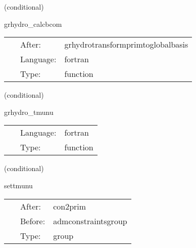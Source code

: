 \documentclass{article}
\begin{document}
\vspace{5mm}

   (conditional) 

\hspace{5mm} grhydro\_calcbcom 

\hspace{5mm}{\it compute comoving magnetic field, pressure, etc... } 


\hspace{5mm}

 \begin{tabular*}{160mm}{cll} 
~ & After:  & grhydrotransformprimtoglobalbasis \\ 
~ & Language:  & fortran \\ 
~ & Type:  & function \\ 
\end{tabular*} 


\vspace{5mm}

   (conditional) 

\hspace{5mm} grhydro\_tmunu 

\hspace{5mm}{\it compute the energy-momentum tensor } 


\hspace{5mm}

 \begin{tabular*}{160mm}{cll} 
~ & Language:  & fortran \\ 
~ & Type:  & function \\ 
\end{tabular*} 


\vspace{5mm}

   (conditional) 

\hspace{5mm} settmunu 

\hspace{5mm}{\it calculate the stress-energy tensor } 


\hspace{5mm}

 \begin{tabular*}{160mm}{cll} 
~ & After:  & con2prim \\ 
~ & Before:  & admconstraintsgroup \\ 
~ & Type:  & group \\ 
\end{tabular*} 
\end{document}
